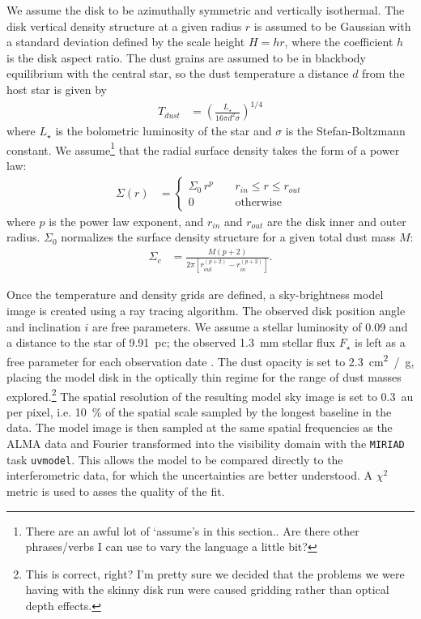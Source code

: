 \documentclass[12pt,oneside]{article}
\begin{document}
We assume the disk to be azimuthally symmetric and vertically isothermal. 
The disk vertical density structure at a given radius $r$ is assumed to be Gaussian with a standard deviation defined by the scale height $H=hr$, where the coefficient $h$ is the disk aspect ratio.
The dust grains are assumed to be in blackbody equilibrium with the central star, so the dust temperature a distance $d$ from the host star is given by
\begin{align}
  T_{dust} &= \left( \frac{L_{\star}}{16 \pi d^2 \sigma} \right)^{1/4}
\end{align}
where $L_{\star}$ is the bolometric luminosity of the star and $\sigma$ is the Stefan-Boltzmann constant. We assume\footnote{There are an awful lot of `assume's in this section.. Are there other phrases/verbs I can use to vary the language a little bit?} that the radial surface density takes the form of a power law: 
\begin{align}
\Sigma(r) &= \begin{cases}
\Sigma_0 \, r^{p} \; \; \; \; & r_{in} \leq r \leq r_{out} \\
0 \; \; \; \; &\mbox{otherwise} 
\end{cases}
\end{align}
where $p$ is the power law exponent, and $r_{in}$ and $r_{out}$ are the disk inner and outer radius. 
$\Sigma_0$ normalizes the surface density structure for a given total dust mass $M$:
\begin{align}
\Sigma_c &= \frac{M \left(p + 2 \right)}{2 \pi \left[ r_{out}^{(p+2)} - r_{in}^{(p+2)} \right]}.
\end{align}

Once the temperature and density grids are defined, a sky-brightness model image is created using a ray tracing algorithm. 
The observed disk position angle and inclination $i$ are free parameters.
We assume a stellar luminosity of \SI{0.09}{\Lsun} and a distance to the star of \SI{9.91}{pc}; the observed \SI{1.3}{mm} stellar flux $F_\star$ is left as a free parameter for each observation date \citep{plavchan09,vanleeuwen07}.
The dust opacity is set to \SI{2.3}{\cm^2 / \gram}, placing the model disk in the optically thin regime for the range of dust masses explored.\footnote{This is correct, right? I'm pretty sure we decided that the problems we were having with the skinny disk run were caused gridding rather than optical depth effects.} 
The spatial resolution of the resulting model sky image is set to \SI{0.3}{au} per pixel, i.e. \SI{10}{\percent} of the spatial scale sampled by the longest baseline in the data. 
The model image is then sampled at the same spatial frequencies as the ALMA data and Fourier transformed into the visibility domain with the \texttt{MIRIAD} task \texttt{uvmodel}. 
This allows the model to be compared directly to the interferometric data, for which the uncertainties are better understood.
A $\chi^2$ metric is used to asses the quality of the fit.
\end{document}
